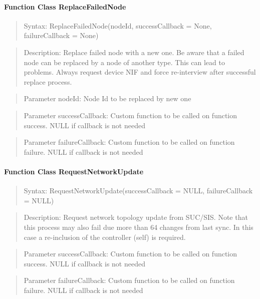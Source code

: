 \paragraph {Function Class ReplaceFailedNode}
\begin{quote} Syntax: ReplaceFailedNode(nodeId, successCallback = None, failureCallback = None)\end{quote}
\begin{quote} Description: Replace failed node with a new one. Be aware that a failed node can be replaced by a node of another type. 
This can lead to problems. Always request device NIF and force re-interview after successful replace process.\end{quote}
\begin{quote} Parameter nodeId: Node Id to be replaced by new one\end{quote}
\begin{quote} Parameter successCallback: Custom function to be called on function success. NULL if callback is not needed\end{quote} 
\begin{quote} Parameter failureCallback: Custom function to be called on function failure. NULL if callback is not needed\end{quote} 

\paragraph {Function Class RequestNetworkUpdate}
\begin{quote} Syntax: RequestNetworkUpdate(successCallback = NULL, failureCallback = NULL)\end{quote}
\begin{quote} Description: Request network topology update from SUC/SIS. Note that this process may also fail due more than 64 changes from last sync. In this case a re-inclusion of the controller (self) is required.\end{quote}
\begin{quote} Parameter successCallback: Custom function to be called on function success. NULL if callback is not needed\end{quote} 
\begin{quote} Parameter failureCallback: Custom function to be called on function failure. NULL if callback is not needed\end{quote} 

